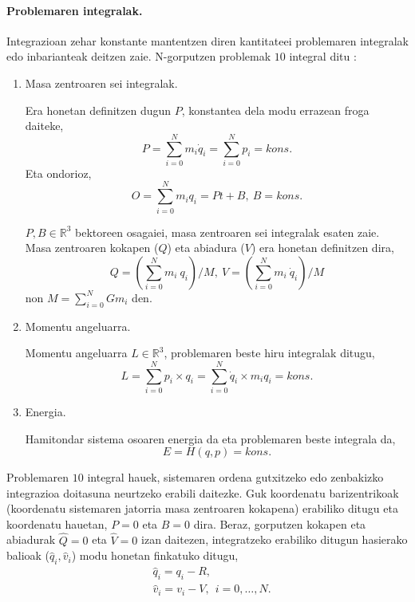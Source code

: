 \paragraph*{Problemaren integralak.}
Integrazioan zehar konstante mantentzen diren kantitateei problemaren integralak edo inbarianteak deitzen zaie. N-gorputzen problemak $10$ integral ditu \cite{Klioner2016}:
\begin{enumerate}


\item Masa zentroaren sei integralak.

Era honetan definitzen dugun $P$, konstantea dela modu errazean froga daiteke, 
\begin{equation*}
P=\sum_{i=0}^{N} m_i \dot{q}_i=\sum_{i=0}^{N} p_i=kons. 
\end{equation*}
Eta ondorioz,
\begin{equation*}
O=\sum_{i=0}^{N} m_i {q}_i=Pt+B, \ B=kons. 
\end{equation*}

$P,B \in \mathbb{R}^3$ bektoreen osagaiei, masa zentroaren sei integralak esaten zaie. Masa zentroaren kokapen ($Q$) eta abiadura ($V$)  era honetan definitzen dira, 
\begin{equation*}
Q={\left(\sum\limits_{i=0}^{N} m_i \ q_i\right)}/{M}, \ V={\left(\sum\limits_{i=0}^{N} m_i \ \dot{q}_i\right)}/{M}
\end{equation*}
non $M=\sum\limits_{i=0}^{N}Gm_i$ den.


\item Momentu angeluarra.

Momentu angeluarra $L\in \mathbb{R}^3$, problemaren beste hiru integralak ditugu, 
\begin{equation*}
L=\sum_{i=0}^{N} p_i \times q_i=\sum_{i=0}^{N} \dot{q}_i \times m_i q_i=kons.
\end{equation*}

\item Energia.

Hamitondar sistema osoaren energia da eta problemaren beste integrala da,
\begin{equation*}
E=H(q,p)=kons.
\end{equation*}

\end{enumerate}

Problemaren $10$ integral hauek, sistemaren ordena gutxitzeko edo zenbakizko integrazioa doitasuna neurtzeko erabili daitezke. Guk koordenatu barizentrikoak (koordenatu sistemaren jatorria masa zentroaren kokapena) erabiliko ditugu eta koordenatu hauetan, $P=0$ eta $B=0$ dira. Beraz, gorputzen kokapen eta abiadurak $\hat{Q}=0$ eta $\hat{V}=0$ izan daitezen, integratzeko erabiliko ditugun hasierako balioak ($\hat{q}_i,\hat{v}_i$) modu honetan finkatuko ditugu,
\begin{align*}
&\hat{q}_i=q_i-R, \\
&\hat{v}_i=v_i-V, \ \ i=0,\dots,N.
\end{align*}

